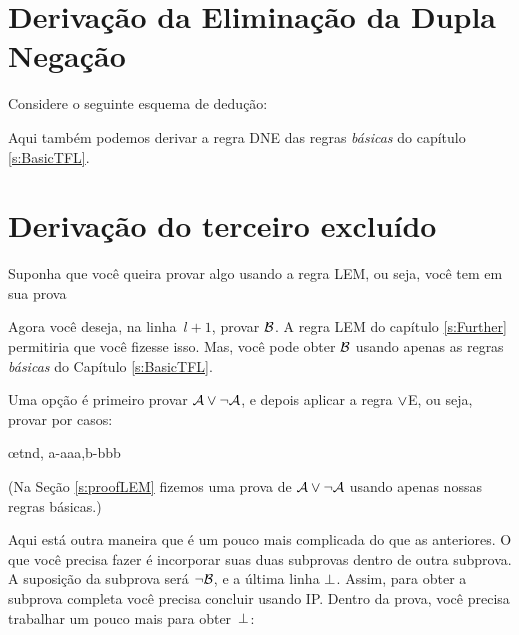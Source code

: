 
\section{Deriva\c c\~ao da Elimina\c c\~ao da Dupla Nega\c c\~ao}
Considere o seguinte esquema de dedu\c c\~ao:
	\begin{fitchproof}
	\open
	\close
\end{fitchproof}
Aqui tamb\'em podemos derivar a regra DNE das regras \emph{b\'asicas} do cap\'itulo \ref{s:BasicTFL}.

\section{Deriva\c c\~ao do terceiro exclu\'ido}
Suponha que voc\^e queira provar algo usando a regra LEM, ou seja, voc\^e tem em sua prova
 
\begin{fitchproof}
  \open
  \close
  \open
  \close
\end{fitchproof}
Agora voc\^e deseja, na linha~$l+1$, provar $\mathcal{B}$. A regra LEM do cap\'itulo \ref{s:Further} permitiria que voc\^e fizesse isso. Mas, voc\^e pode obter $\mathcal{B}$ usando apenas as regras  \emph{b\'asicas} do Cap\'itulo \ref{s:BasicTFL}.

Uma op\c c\~ao \'e primeiro provar  $\mathcal{A} \vee \neg\mathcal{A}$, e depois aplicar a regra $\vee$E, ou seja, provar por casos:
\begin{fitchproof}
  \open
  \close
  \open
  \close
  \ellipsesline
  \oe{tnd, a-aaa,b-bbb}
\end{fitchproof}
(Na Seç\~ao \ref{s:proofLEM} fizemos uma prova de $\mathcal{A} \vee \neg\mathcal{A}$  usando apenas nossas regras b\'asicas.)

Aqui est\'a outra maneira que \'e um pouco mais complicada do que as anteriores. O que voc\^e precisa fazer \'e incorporar suas duas subprovas dentro de outra subprova. A suposi\c c\~ao da subprova ser\'a $\neg \mathcal{B}$, e a  \'ultima linha $\bot$. Assim,  para obter a subprova completa voc\^e precisa concluir  usando IP. Dentro da prova, voc\^e precisa trabalhar um pouco mais para obter~$\bot$:

